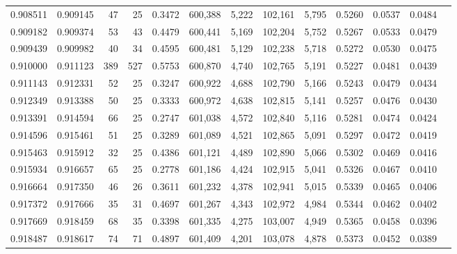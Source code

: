 \begin{tabular}{rrrrrrrrrrrrr}
0.908511 & 0.909145 &    47 &  25 &                                     0.3472 & 600,388 &   5,222 & 102,161 &   5,795 & 0.5260 & 0.0537 & 0.0484 \\
0.909182 & 0.909374 &    53 &  43 &                                     0.4479 & 600,441 &   5,169 & 102,204 &   5,752 & 0.5267 & 0.0533 & 0.0479 \\
0.909439 & 0.909982 &    40 &  34 &                                     0.4595 & 600,481 &   5,129 & 102,238 &   5,718 & 0.5272 & 0.0530 & 0.0475 \\
0.910000 & 0.911123 &   389 & 527 &                                     0.5753 & 600,870 &   4,740 & 102,765 &   5,191 & 0.5227 & 0.0481 & 0.0439 \\
0.911143 & 0.912331 &    52 &  25 &                                     0.3247 & 600,922 &   4,688 & 102,790 &   5,166 & 0.5243 & 0.0479 & 0.0434 \\
0.912349 & 0.913388 &    50 &  25 &                                     0.3333 & 600,972 &   4,638 & 102,815 &   5,141 & 0.5257 & 0.0476 & 0.0430 \\
0.913391 & 0.914594 &    66 &  25 &                                     0.2747 & 601,038 &   4,572 & 102,840 &   5,116 & 0.5281 & 0.0474 & 0.0424 \\
0.914596 & 0.915461 &    51 &  25 &                                     0.3289 & 601,089 &   4,521 & 102,865 &   5,091 & 0.5297 & 0.0472 & 0.0419 \\
0.915463 & 0.915912 &    32 &  25 &                                     0.4386 & 601,121 &   4,489 & 102,890 &   5,066 & 0.5302 & 0.0469 & 0.0416 \\
0.915934 & 0.916657 &    65 &  25 &                                     0.2778 & 601,186 &   4,424 & 102,915 &   5,041 & 0.5326 & 0.0467 & 0.0410 \\
0.916664 & 0.917350 &    46 &  26 &                                     0.3611 & 601,232 &   4,378 & 102,941 &   5,015 & 0.5339 & 0.0465 & 0.0406 \\
0.917372 & 0.917666 &    35 &  31 &                                     0.4697 & 601,267 &   4,343 & 102,972 &   4,984 & 0.5344 & 0.0462 & 0.0402 \\
0.917669 & 0.918459 &    68 &  35 &                                     0.3398 & 601,335 &   4,275 & 103,007 &   4,949 & 0.5365 & 0.0458 & 0.0396 \\
0.918487 & 0.918617 &    74 &  71 &                                     0.4897 & 601,409 &   4,201 & 103,078 &   4,878 & 0.5373 & 0.0452 & 0.0389 \\

\end{tabular}
